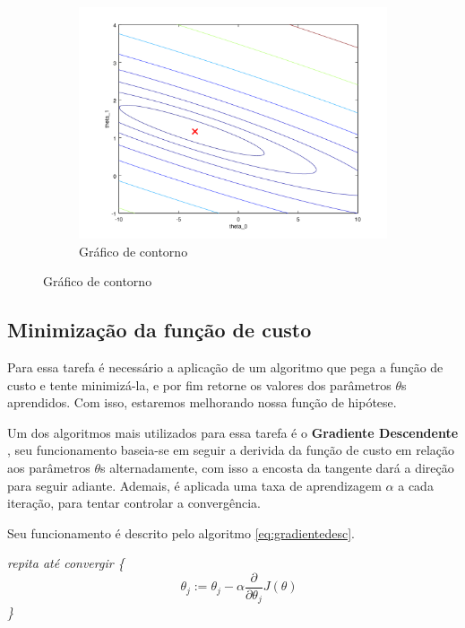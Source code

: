 \begin{figure}
\begin{subfigure}[htb]{0.5\textwidth}
    \includegraphics[width=\textwidth]{img/funcaodecustocontorno} 
    \caption{Gráfico de contorno} \label{fig:funcaodecustocontorno}
  \end{subfigure} 

\end{figure}


\subsection{Minimização da função de custo}

Para essa tarefa é necessário a aplicação de um algoritmo que pega a função de custo e tente minimizá-la, e por fim retorne os valores dos parâmetros $ \theta $s aprendidos. Com isso, estaremos melhorando nossa função de hipótese. 

Um dos algoritmos mais utilizados para essa tarefa é o \textbf{Gradiente Descendente} \cite{michalski2013machine}, seu funcionamento baseia-se em seguir a derivida da função de custo em relação aos parâmetros $\theta$s alternadamente, com isso a encosta da tangente dará a direção para seguir adiante. Ademais, é aplicada uma taxa de aprendizagem $ \alpha $ a cada iteração, para tentar controlar a convergência.

Seu funcionamento é descrito pelo algoritmo \ref{eq:gradientedesc}.

\textit{repita até convergir \{}
\begin{equation}
\label{eq:gradientedesc}
\quad \theta_j := \theta_j - \alpha \frac{\partial}{\partial\theta_j} J(\theta)
\end{equation}
\textit{\quad\quad\quad \}}

